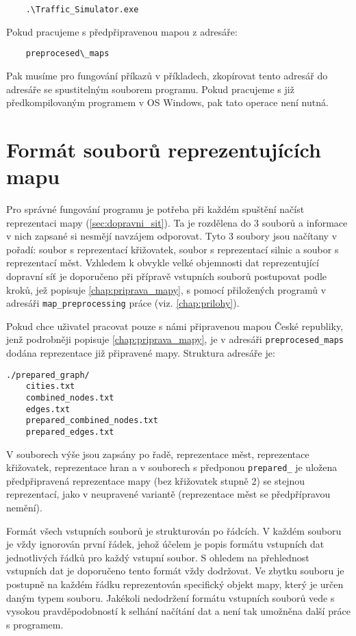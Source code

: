 \begin{verbatim}
    .\Traffic_Simulator.exe
\end{verbatim}

Pokud pracujeme s předpřipravenou mapou z adresáře:
\begin{verbatim}
    preprocesed\_maps
\end{verbatim}

Pak musíme pro fungování příkazů v příkladech, zkopírovat tento adresář do 
adresáře se spustitelným souborem programu. Pokud pracujeme s již
předkompilovaným programem v OS Windows, pak tato operace není nutná.

\section{Formát souborů reprezentujících mapu}
\label{sec:soubor_mapy}

Pro správné fungování programu je potřeba při každém spuštění načíst reprezentaci
mapy (\cref{sec:dopravni_sit}).
Ta je rozdělena do 3 souborů a informace v nich zapsané si nesmějí 
navzájem odporovat. Tyto 3 soubory jsou načítany v pořadí: soubor s reprezentací
křižovatek, soubor s reprezentací silnic a soubor s reprezentací měst.
Vzhledem k obvykle velké objemnosti dat reprezentující dopravní síť je 
doporučeno při přípravě vstupních souborů postupovat podle
kroků, jež popisuje \cref{chap:priprava_mapy}, s pomocí přiložených programů
v adresáři \texttt{map\_preprocessing} práce (viz. \cref{chap:prilohy}).

Pokud chce uživatel pracovat pouze s námi připravenou mapou České republiky, 
jenž podrobněji popisuje \cref{chap:priprava_mapy}, je v adresáři
\texttt{preprocesed\_maps} dodána reprezentace již připravené mapy.
Struktura adresáře je:

\begin{verbatim}
./prepared_graph/
    cities.txt
    combined_nodes.txt
    edges.txt
    prepared_combined_nodes.txt
    prepared_edges.txt
\end{verbatim}

V souborech výše jsou zapsány po řadě, reprezentace měst, reprezentace křižovatek,
reprezentace hran a v souborech s předponou \texttt{prepared\_} je uložena 
předpřipravená reprezentace mapy (bez křižovatek stupně 2) se stejnou reprezentací,
jako v neupravené variantě (reprezentace měst se předpřípravou nemění).

Formát všech vstupních souborů je strukturován po řádcích. V každém souboru
je vždy ignorován první řádek, jehož účelem je popis formátu vstupních dat 
jednotlivých řádků pro každý vstupní soubor. S ohledem na 
přehlednost vstupních dat je doporučeno tento formát vždy dodržovat.
Ve zbytku souboru je postupně na každém řádku reprezentován specifický objekt
mapy, který je určen daným typem souboru. Jakékoli nedodržení formátu
vstupních souborů vede s vysokou pravděpodobností k selhání načítání dat a
není tak umožněna další práce s programem.


